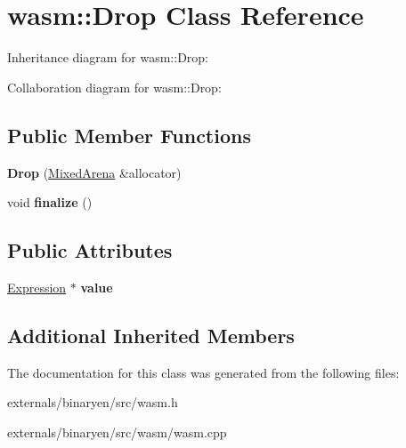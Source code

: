 \hypertarget{classwasm_1_1_drop}{}\section{wasm\+:\+:Drop Class Reference}
\label{classwasm_1_1_drop}


Inheritance diagram for wasm\+:\+:Drop\+:


Collaboration diagram for wasm\+:\+:Drop\+:
\subsection*{Public Member Functions}
\begin{DoxyCompactItemize}
\item 
\mbox{\label{classwasm_1_1_drop_a9827bb001bd61d552953ca0c5bbb441b}} 
{\bfseries Drop} (\mbox{\hyperlink{struct_mixed_arena}{Mixed\+Arena}} \&allocator)
\item 
\mbox{\label{classwasm_1_1_drop_a75d662486988d98f45b7bf76044a45db}} 
void {\bfseries finalize} ()
\end{DoxyCompactItemize}
\subsection*{Public Attributes}
\begin{DoxyCompactItemize}
\item 
\mbox{\label{classwasm_1_1_drop_ace266e7fe792acb9e61491b95ee538e5}} 
\mbox{\hyperlink{classwasm_1_1_expression}{Expression}} $\ast$ {\bfseries value}
\end{DoxyCompactItemize}
\subsection*{Additional Inherited Members}


The documentation for this class was generated from the following files\+:\begin{DoxyCompactItemize}
\item 
externals/binaryen/src/wasm.\+h\item 
externals/binaryen/src/wasm/wasm.\+cpp\end{DoxyCompactItemize}
